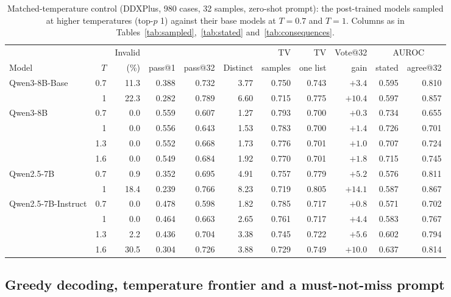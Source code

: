 \documentclass[wcp]{jmlr}
\begin{document}
\begin{table}[t]
\centering\small
\begin{adjustbox}{max width=\linewidth}
\begin{tabular}{lrrrrrrrrrr}
\toprule
 & & Invalid & & & & TV & TV & Vote@32 & \multicolumn{2}{c}{AUROC} \\
Model & $T$ & (\%) & pass@1 & pass@32 & Distinct & samples & one list & gain & stated & agree@32 \\
\midrule
Qwen3-8B-Base & 0.7 & 11.3 & 0.388 & 0.732 & 3.77 & 0.750 & 0.743 & $+3.4$ & 0.595 & 0.810 \\
 & 1 & 22.3 & 0.282 & 0.789 & 6.60 & 0.715 & 0.775 & $+10.4$ & 0.597 & 0.857 \\
Qwen3-8B & 0.7 & 0.0 & 0.559 & 0.607 & 1.27 & 0.793 & 0.700 & $+0.3$ & 0.734 & 0.655 \\
 & 1 & 0.0 & 0.556 & 0.643 & 1.53 & 0.783 & 0.700 & $+1.4$ & 0.726 & 0.701 \\
 & 1.3 & 0.0 & 0.552 & 0.668 & 1.73 & 0.776 & 0.701 & $+1.0$ & 0.707 & 0.724 \\
 & 1.6 & 0.0 & 0.549 & 0.684 & 1.92 & 0.770 & 0.701 & $+1.8$ & 0.715 & 0.745 \\
\midrule
Qwen2.5-7B & 0.7 & 0.9 & 0.352 & 0.695 & 4.91 & 0.757 & 0.779 & $+5.2$ & 0.576 & 0.811 \\
 & 1 & 18.4 & 0.239 & 0.766 & 8.23 & 0.719 & 0.805 & $+14.1$ & 0.587 & 0.867 \\
Qwen2.5-7B-Instruct & 0.7 & 0.0 & 0.478 & 0.598 & 1.82 & 0.785 & 0.717 & $+0.8$ & 0.571 & 0.702 \\
 & 1 & 0.0 & 0.464 & 0.663 & 2.65 & 0.761 & 0.717 & $+4.4$ & 0.583 & 0.767 \\
 & 1.3 & 2.2 & 0.436 & 0.704 & 3.38 & 0.745 & 0.722 & $+5.6$ & 0.602 & 0.794 \\
 & 1.6 & 30.5 & 0.304 & 0.726 & 3.88 & 0.729 & 0.749 & $+10.0$ & 0.637 & 0.814 \\
\bottomrule
\end{tabular}
\end{adjustbox}
\caption{Matched-temperature control (DDXPlus, 980 cases, 32 samples, zero-shot prompt): the post-trained models sampled at higher temperatures (top-$p$ 1) against their base models at $T{=}0.7$ and $T{=}1$. Columns as in Tables~\ref{tab:sampled},~\ref{tab:stated} and~\ref{tab:consequences}.}
\label{tab:matcht}
\end{table}

\subsection{Greedy decoding, temperature frontier and a must-not-miss prompt}\label{sec:decoding}
\end{document}
